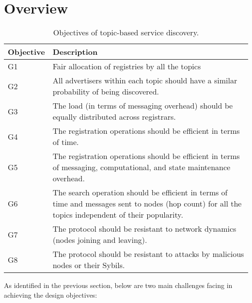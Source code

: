 \section{Overview}
\label{sec:overview}

\begin{table} 
\caption{Objectives of topic-based service discovery.}
\label{tab:objectives}
\renewcommand{\arraystretch}{1.5}
\renewcommand{\tabcolsep}{0.5em}
\centering
\scriptsize{
\begin{tabular} {p{1cm}p{5cm}}
\toprule
\textbf{Objective} & \textbf{Description} \\
\hline
G1 & Fair allocation of registries by all the topics \\
\hline
G2 & All advertisers within each topic should have a similar probability of being discovered. \\
\hline
G3 & The load (in terms of messaging overhead) should be equally distributed across registrars. \\
\hline
G4 & The registration operations should be efficient in terms of time. \\
\hline
G5 & The registration operations should be efficient in terms of messaging, computational, and state maintenance overhead. \\
\hline 
G6 & The search operation should be efficient in terms of time and messages sent to nodes (hop count) for all the topics independent of their popularity. \\
\hline
G7 & The protocol should be resistant to network dynamics (nodes joining and leaving). \\
\hline 
G8 & The protocol should be resistant to attacks by malicious nodes or their Sybils. \\
\hline
\end{tabular}
}
\vspace{-0.2in}
\end{table}


As identified in the previous section, below are two main challenges facing \sysname in achieving the design objectives:

